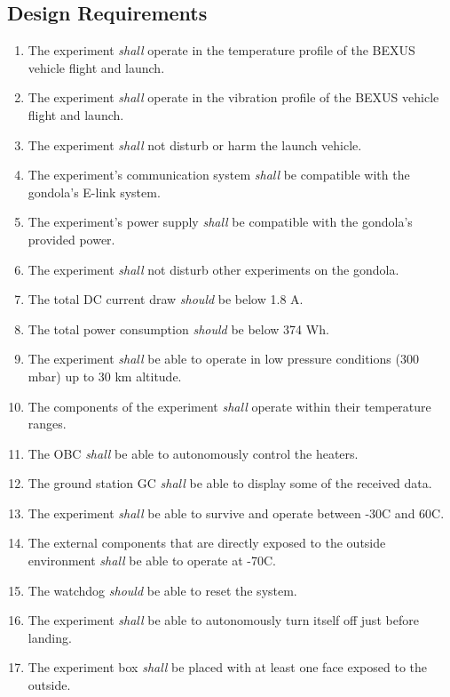 \subsection{Design Requirements}

\begin{enumerate}[label=D.\arabic*]
    \item The experiment \textit{shall} operate in the temperature profile of the BEXUS vehicle flight and launch.
    \item The experiment \textit{shall} operate in the vibration profile of the BEXUS vehicle flight and launch.
    \item The experiment \textit{shall} not disturb or harm the launch vehicle.
    \item The experiment's communication system \textit{shall} be compatible with the gondola's E-link system.
    \item The experiment's power supply \textit{shall} be compatible with the gondola's provided power.
    \item The experiment \textit{shall} not disturb other experiments on the gondola.
    \item The total DC current draw \textit{should} be below 1.8 A.
    \item The total power consumption \textit{should} be below 374 Wh.
    \item The experiment \textit{shall} be able to operate in low pressure conditions (300 mbar) up to 30 km altitude.
    \item The components of the experiment \textit{shall} operate within their temperature ranges.
    \item The OBC \textit{shall} be able to autonomously control the heaters.
    \item The ground station GC \textit{shall} be able to display some of the received data.
    \item The experiment \textit{shall} be able to survive and operate between -30\degree C and 60\degree C.
    \item The external components that are directly exposed to the outside environment \textit{shall} be able to operate at -70\degree C.
    \item The watchdog \textit{should} be able to reset the system.
    \item The experiment \textit{shall} be able to autonomously turn itself off just before landing.
    \item The experiment box \textit{shall} be placed with at least one face exposed to the outside. 
\end{enumerate}